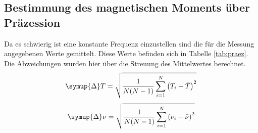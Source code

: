 \subsection{Bestimmung des magnetischen Moments über Präzession}
Da es schwierig ist eine konstante Frequenz einzustellen sind die für die Messung angegebenen Werte gemittelt.
Diese Werte befinden sich in Tabelle \ref{tab:praez}. Die Abweichungen wurden hier über die Streuung des Mittelwertes berechnet.
\begin{equation}
  \symup{\Delta} T = \sqrt{\frac{1}{N(N-1)}\sum_{i=1}^{N}\left(T_i-\bar{T}\right)^2}
\end{equation}
\begin{equation}
  \symup{\Delta} \nu = \sqrt{\frac{1}{N(N-1)}\sum_{i=1}^{N}\left(\nu_i-\bar{\nu}\right)^2}
\end{equation}

